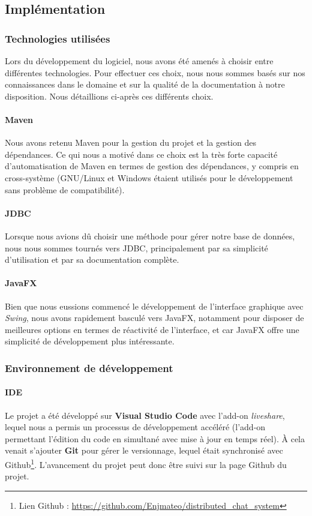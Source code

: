 \documentclass[12pt, a4paper]{article}
\begin{document}
    
    \subsection{Implémentation}
    \subsubsection{Technologies utilisées}
    Lors du développement du logiciel, nous avons été amenés à choisir entre différentes technologies. Pour effectuer ces choix, nous nous sommes basés sur nos connaissances dans le domaine et sur la qualité de la documentation à notre disposition. Nous détaillions ci-après ces différents choix.
    
    \paragraph{Maven} Nous avons retenu Maven pour la gestion du projet et la gestion des dépendances. Ce qui nous a motivé dans ce choix est la très forte capacité d'automatisation de Maven en termes de gestion des dépendances, y compris en cross-système (GNU/Linux et Windows étaient utilisés pour le développement sans problème de compatibilité).
    
    \paragraph{JDBC} Lorsque nous avions dû choisir une méthode pour gérer notre base de données, nous nous sommes tournés vers JDBC, principalement par sa simplicité d'utilisation et par sa documentation complète.
    
    \paragraph{JavaFX} Bien que nous eussions commencé le développement de l'interface graphique avec \textit{Swing}, nous avons rapidement basculé vers JavaFX, notamment pour disposer de meilleures options en termes de réactivité de l'interface, et car JavaFX offre une simplicité de développement plus intéressante.
    
    \subsubsection{Environnement de développement}
    \paragraph{IDE}
    Le projet a été développé sur \textbf{Visual Studio Code} avec l'add-on \textit{liveshare},  lequel nous a permis un processus de développement accéléré (l'add-on permettant l'édition du code en simultané avec mise à jour en temps réel). À cela venait s'ajouter \textbf{Git} pour gérer le versionnage, lequel était synchronisé avec Github\footnote{Lien Github : \url{https://github.com/Enjmateo/distributed_chat_system}}. L'avancement du projet peut donc être suivi sur la page Github du projet.
    
\end{document}
